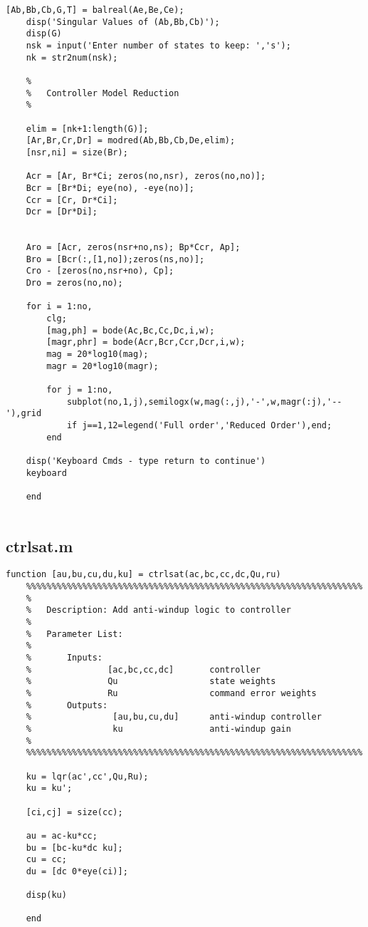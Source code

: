 \begin{lstlisting}[gobble=4]
	[Ab,Bb,Cb,G,T] = balreal(Ae,Be,Ce);
	disp('Singular Values of (Ab,Bb,Cb)');
	disp(G)
	nsk = input('Enter number of states to keep: ','s');
	nk = str2num(nsk);

	%
	%	Controller Model Reduction
	%
	
	elim = [nk+1:length(G)];
	[Ar,Br,Cr,Dr] = modred(Ab,Bb,Cb,De,elim);
	[nsr,ni] = size(Br);
	
	Acr = [Ar, Br*Ci; zeros(no,nsr), zeros(no,no)];
	Bcr = [Br*Di; eye(no), -eye(no)];
	Ccr = [Cr, Dr*Ci];
	Dcr = [Dr*Di];
	
	
	Aro = [Acr, zeros(nsr+no,ns); Bp*Ccr, Ap];
	Bro = [Bcr(:,[1,no]);zeros(ns,no)];
	Cro - [zeros(no,nsr+no), Cp];
	Dro = zeros(no,no);
	
	for i = 1:no,
		clg;
		[mag,ph] = bode(Ac,Bc,Cc,Dc,i,w);
		[magr,phr] = bode(Acr,Bcr,Ccr,Dcr,i,w);
		mag = 20*log10(mag);
		magr = 20*log10(magr);
		
		for j = 1:no,
			subplot(no,1,j),semilogx(w,mag(:,j),'-',w,magr(:j),'--'),grid
			if j==1,12=legend('Full order','Reduced Order'),end;
		end
	
	disp('Keyboard Cmds - type return to continue')
	keyboard
	
	end
	
\end{lstlisting}

\newpage

\subsection{ctrlsat.m}

\begin{lstlisting}[gobble=4]
	function [au,bu,cu,du,ku] = ctrlsat(ac,bc,cc,dc,Qu,ru)
	%%%%%%%%%%%%%%%%%%%%%%%%%%%%%%%%%%%%%%%%%%%%%%%%%%%%%%%%%%%%%%%%%%
	%
	%	Description: Add anti-windup logic to controller
	%
	%	Parameter List:
	%
	%		Inputs:	
	%				[ac,bc,cc,dc]		controller
	%				Qu					state weights
	%				Ru					command error weights
	%		Outputs:
	%				 [au,bu,cu,du]		anti-windup controller
	%				 ku					anti-windup gain
	%				
	%%%%%%%%%%%%%%%%%%%%%%%%%%%%%%%%%%%%%%%%%%%%%%%%%%%%%%%%%%%%%%%%%%
	
	ku = lqr(ac',cc',Qu,Ru);
	ku = ku';
	
	[ci,cj] = size(cc);
	
	au = ac-ku*cc;
	bu = [bc-ku*dc ku];
	cu = cc;
	du = [dc 0*eye(ci)];
	
	disp(ku)
	
	end
	
\end{lstlisting}


